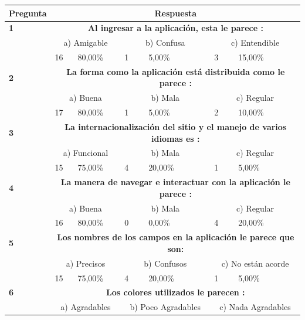 \documentclass[letterpaper, 11pt, oneside]{article}
\theoremstyle{definition}
\theoremstyle{remark}
\begin{document}
\begin{table}[htbp]
\begin{center}
\begin{tabular}{|p{1.6cm}|p{1.8cm}|p{1.8cm}|p{1.8cm}|p{1.8cm}|p{1.8cm}|p{1.8cm}|}
\hline
\textbf{Pregunta} & \multicolumn{ 6}{c|}{\textbf{Respuesta}} \\ \hline
\textbf{1} & \multicolumn{ 6}{c|}{\textbf{Al ingresar a la aplicación, esta le parece :}} \\ \hline
 & \multicolumn{ 2}{c|}{a) Amigable} & \multicolumn{ 2}{c|}{b) Confusa} & \multicolumn{ 2}{c|}{c) Entendible} \\ \hline
 & 16 & 80,00\% & 1 & 5,00\% & 3 & 15,00\% \\ \hline
\textbf{2} & \multicolumn{ 6}{c|}{\textbf{La forma como la aplicación está distribuida como le parece :}} \\ \hline
 & \multicolumn{ 2}{c|}{a) Buena} & \multicolumn{ 2}{c|}{b) Mala} & \multicolumn{ 2}{c|}{c) Regular} \\ \hline
 & 17 & 80,00\% & 1 & 5,00\% & 2 & 10,00\% \\ \hline
\textbf{3} & \multicolumn{ 6}{c|}{\textbf{La internacionalización del sitio y el manejo de varios idiomas es :}} \\ \hline
 & \multicolumn{ 2}{c|}{a) Funcional} & \multicolumn{ 2}{c|}{b) Mala} & \multicolumn{ 2}{c|}{c) Regular} \\ \hline
 & 15 & 75,00\% & 4 & 20,00\% & 1 & 5,00\% \\ \hline
\textbf{4} & \multicolumn{ 6}{c|}{\textbf{La manera de navegar e interactuar con la aplicación le parece :}} \\ \hline
 & \multicolumn{ 2}{c|}{a) Buena} & \multicolumn{ 2}{c|}{b) Mala} & \multicolumn{ 2}{c|}{c) Regular} \\ \hline
 & 16 & 80,00\% & 0 & 0,00\% & 4 & 20,00\% \\ \hline
\textbf{5} & \multicolumn{ 6}{c|}{\textbf{Los nombres de los campos en la aplicación le parece que son:}} \\ \hline
 & \multicolumn{ 2}{c|}{a) Precisos} & \multicolumn{ 2}{c|}{b) Confusos} & \multicolumn{ 2}{c|}{c) No están acorde} \\ \hline
 & 15 & 75,00\% & 4 & 20,00\% & 1 & 5,00\% \\ \hline
\textbf{6} & \multicolumn{ 6}{c|}{\textbf{Los colores utilizados le parecen :}} \\ \hline
 & \multicolumn{ 2}{c|}{a) Agradables} & \multicolumn{ 2}{c|}{b) Poco Agradables} & \multicolumn{ 2}{c|}{c) Nada Agradables} \\ \hline

\end{tabular}
\end{center}
\end{table}
\end{document}
